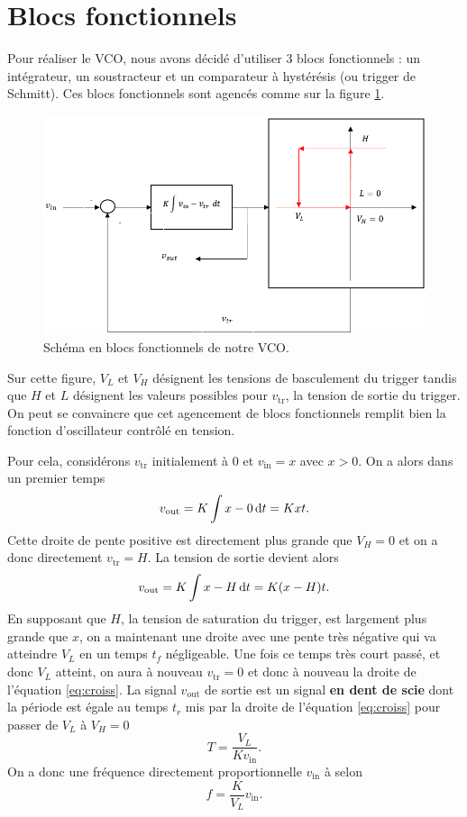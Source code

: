 

\section{Blocs fonctionnels}
Pour réaliser le VCO, nous avons décidé d'utiliser 3 blocs
fonctionnels : un intégrateur, un soustracteur et un
comparateur à hystérésis (ou trigger de Schmitt). Ces blocs
fonctionnels sont agencés comme sur la figure \ref{fig:blocs}.

\begin{figure}[ht]
	\centering
	\includegraphics[scale=0.85]{img/blocs-fonctionnels.png}
	\caption{Schéma en blocs fonctionnels de notre VCO.}
	\label{fig:blocs}
\end{figure}

Sur cette figure, $V_L$ et $V_H$ désignent les tensions de
basculement du trigger tandis que $H$ et $L$ désignent
les valeurs possibles pour $v_{\text{tr}}$, la tension de sortie
du trigger. On peut se convaincre que cet agencement de blocs
fonctionnels remplit bien la fonction d'oscillateur contrôlé en tension. 

Pour cela, considérons $v_{\text{tr}}$ initialement à \unit{0}{\volt}
et $v_{\text{in}} = x$ avec $x > 0$. On a alors dans un premier temps
\begin{equation}
	v_{\text{out}} = K\int x - 0 \operatorname{d}\! t = Kxt.
	\label{eq:croiss}
\end{equation}
Cette droite de pente positive est directement plus grande que $V_H = 0$
et on a donc directement $v_{\text{tr}} = H$. La tension de sortie
devient alors
\begin{equation}
	v_{\text{out}} = K\int x - H \operatorname{d}\! t = K(x-H)t.
	\label{eq:decroiss}
\end{equation}
En supposant que $H$, la tension de saturation du trigger, est largement
plus grande que $x$, on a maintenant une droite avec une pente
très négative qui va atteindre $V_L$ en un temps $t_f$ négligeable.
Une fois ce temps très court passé, et donc $V_L$ atteint, on aura
à nouveau $v_{\text{tr}} = 0$ et donc à nouveau la droite de
l'équation \ref{eq:croiss}. La signal $v_{\text{out}}$ de sortie
est un signal \textbf{en dent de scie} dont la période est
égale au temps $t_r$ mis par la droite de l'équation \ref{eq:croiss}
pour passer de $V_L$ à $V_H = 0$ 
\[ T = \frac{V_L}{Kv_\text{in}}. \]
On a donc une fréquence directement proportionnelle $v_\text{in}$ à
selon
\[ f = \frac{K}{V_L}v_\text{in}. \]

